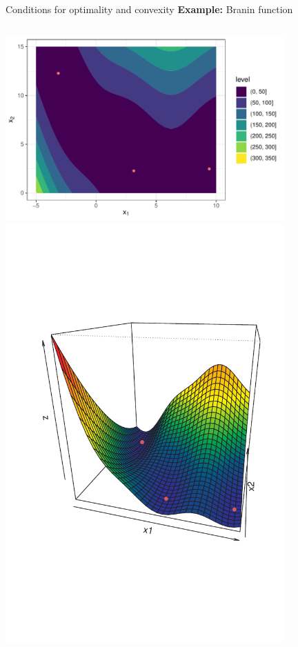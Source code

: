 \documentclass[11pt,compress,t,notes=noshow, xcolor=table]{beamer}
\begin{document}
\begin{vbframe}{Conditions for optimality and convexity}
\textbf{Example: } Branin function 

\vspace*{-0.5cm}

\begin{columns}
\begin{column}{0.4\textwidth}
\includegraphics[width = 0.8\textwidth]{figure_man/branin3d/branin2D.pdf} \\  \vspace*{-1cm}
\includegraphics[width = 0.8\textwidth]{figure_man/branin3d/branin3D.pdf} 

\end{column}
\end{columns}
\end{vbframe}
\end{document}
